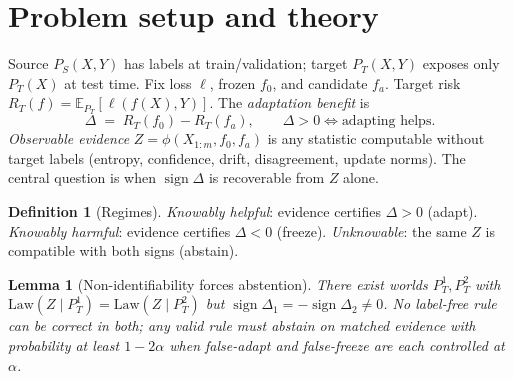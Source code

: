 \documentclass[11pt]{article}
\theoremstyle{plain}
\newtheorem{lemma}{Lemma}
\theoremstyle{definition}
\newtheorem{definition}{Definition}
\theoremstyle{remark}
\newcommand{\E}{\mathbb{E}}
\newcommand{\sign}{\operatorname{sign}}
\newcommand{\Law}{\mathrm{Law}}
\begin{document}
\section{Problem setup and theory}\label{sec:setup}\label{sec:theory}
Source $P_S(X,Y)$ has labels at train/validation; target $P_T(X,Y)$ exposes only $P_T(X)$
at test time. Fix loss $\ell$, frozen $f_0$, and candidate $f_a$. Target risk
$R_T(f)=\E_{P_T}[\ell(f(X),Y)]$. The \emph{adaptation benefit} is
\begin{equation}
\Delta \;=\; R_T(f_0)-R_T(f_a),\qquad \Delta>0 \iff \text{adapting helps.}
\end{equation}
\emph{Observable evidence} $Z=\phi(X_{1:m},f_0,f_a)$ is any statistic computable without
target labels (entropy, confidence, drift, disagreement, update norms). The central
question is when $\sign\Delta$ is recoverable from $Z$ alone.

\begin{center}
\end{center}

\begin{definition}[Regimes]
\emph{Knowably helpful}: evidence certifies $\Delta>0$ (adapt).
\emph{Knowably harmful}: evidence certifies $\Delta<0$ (freeze).
\emph{Unknowable}: the same $Z$ is compatible with both signs (abstain).
\end{definition}

\begin{lemma}[Non-identifiability forces abstention]\label{lem:nonid}
There exist worlds $P_T^1,P_T^2$ with $\Law(Z\mid P_T^1)=\Law(Z\mid P_T^2)$ but
$\sign\Delta_1=-\sign\Delta_2\neq0$. No label-free rule can be correct in both; any
valid rule must abstain on matched evidence with probability at least $1-2\alpha$
when false-adapt and false-freeze are each controlled at $\alpha$.
\end{lemma}
\end{document}
